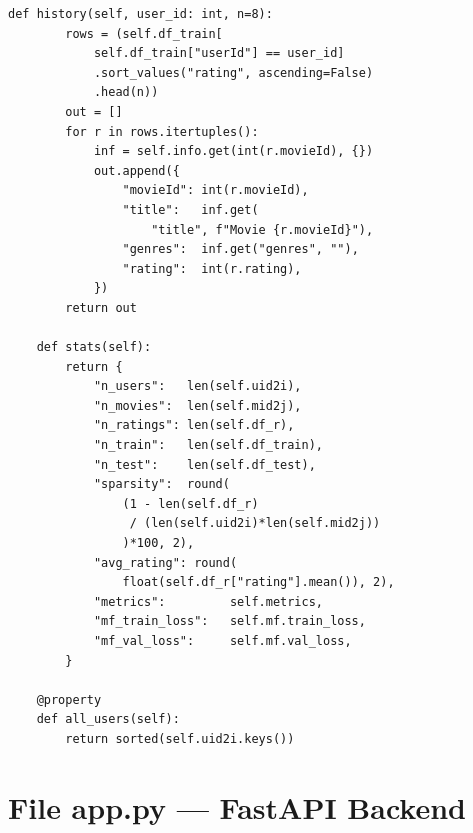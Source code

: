 ﻿\documentclass[../BTL.tex]{subfiles}
\begin{document}
\begin{lstlisting}[style=python,
    caption={models.py -- User-based CF / Item-based CF /
              Matrix Factorization / RecommendationSystem facade}]
    def history(self, user_id: int, n=8):
        rows = (self.df_train[
            self.df_train["userId"] == user_id]
            .sort_values("rating", ascending=False)
            .head(n))
        out = []
        for r in rows.itertuples():
            inf = self.info.get(int(r.movieId), {})
            out.append({
                "movieId": int(r.movieId),
                "title":   inf.get(
                    "title", f"Movie {r.movieId}"),
                "genres":  inf.get("genres", ""),
                "rating":  int(r.rating),
            })
        return out

    def stats(self):
        return {
            "n_users":   len(self.uid2i),
            "n_movies":  len(self.mid2j),
            "n_ratings": len(self.df_r),
            "n_train":   len(self.df_train),
            "n_test":    len(self.df_test),
            "sparsity":  round(
                (1 - len(self.df_r)
                 / (len(self.uid2i)*len(self.mid2j))
                )*100, 2),
            "avg_rating": round(
                float(self.df_r["rating"].mean()), 2),
            "metrics":         self.metrics,
            "mf_train_loss":   self.mf.train_loss,
            "mf_val_loss":     self.mf.val_loss,
        }

    @property
    def all_users(self):
        return sorted(self.uid2i.keys())
\end{lstlisting}

\section{File app.py — FastAPI Backend}
\label{appendix:app}
\end{document}
